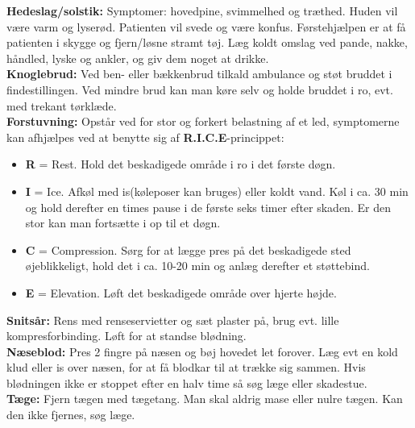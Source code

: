 \documentclass[../../../main.tex]{subfiles}
\begin{document}
\begin{multicols}{2}
\textbf{Hedeslag/solstik:} Symptomer: hovedpine, svimmelhed og træthed. Huden vil være varm og lyserød. Patienten vil svede og være konfus. Førstehjælpen er at få patienten i skygge og fjern/løsne stramt tøj. Læg koldt omslag ved pande, nakke, håndled, lyske og ankler, og giv dem noget at drikke.
\\

\textbf{Knoglebrud:} Ved ben- eller bækkenbrud tilkald ambulance og støt bruddet i findestillingen. Ved mindre brud kan man køre selv og holde bruddet i ro, evt. med trekant tørklæde.
\\

\textbf{Forstuvning:} Opstår ved for stor og forkert belastning af et led, symptomerne kan afhjælpes ved at benytte sig af \textbf{R.I.C.E}-princippet:
\begin{itemize}
    \item \textbf{R} = Rest. Hold det beskadigede område i ro i det første døgn.

    \item \textbf{I} = Ice. Afkøl med is(køleposer kan bruges) eller koldt vand. Køl i ca. 30 min og hold derefter en times pause i de første seks timer efter skaden. Er den stor kan man fortsætte i op til et døgn.

    \item \textbf{C} = Compression. Sørg for at lægge pres på det beskadigede sted øjeblikkeligt, hold det i ca. 10-20 min og anlæg derefter et støttebind.

    \item \textbf{E} = Elevation. Løft det beskadigede område over hjerte højde.
\end{itemize}

\textbf{Snitsår:} Rens med renseservietter og sæt plaster på, brug evt. lille kompresforbinding. Løft for at standse blødning.
\\

\textbf{Næseblod:} Pres 2 fingre på næsen og bøj hovedet let forover. Læg evt en kold klud eller is over næsen, for at få blodkar til at trække sig sammen. Hvis blødningen ikke er stoppet efter en halv time så søg læge eller skadestue.
\\

\textbf{Tæge:} Fjern tægen med tægetang. Man skal aldrig mase eller nulre tægen. Kan den ikke fjernes, søg læge.
\\


\end{multicols}
\end{document}
